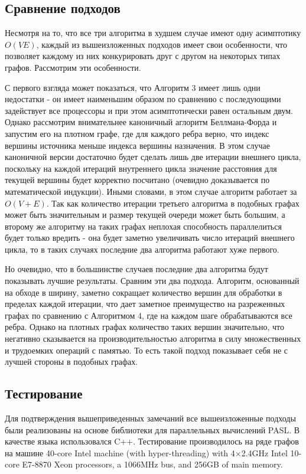 \FloatBarrier
\subsection{Сравнение подходов}
Несмотря на то, что все три алгоритма в худшем случае имеют одну асимптотику  $O(VE)$, каждый из вышеизложенных подходов имеет свои особенности, что позволяет каждому из них конкурировать друг с другом на некоторых типах графов. Рассмотрим эти особенности.

С первого взгляда может показаться, что Алгоритм 3 имеет лишь одни недостатки - он имеет наименьшим образом по сравнению с последующими задействует все процессоры и при этом асимптотически равен остальным двум. Однако рассмотрим внимательнее каноничный аглоритм Беллмана-Форда и запустим его на плотном графе, где для каждого ребра верно, что индекс вершины источника меньше индекса вершины назначения. В этом случае каноничной версии достаточно будет сделать лишь две итерации внешнего цикла, поскольку на каждой итераций внутреннего цикла значение расстояния для текущей вершины будет корректно посчитано (очевидно доказывается по математической индукции). Иными словами, в этом случае алгоритм работает за $O(V + E)$. Так как количество итерации третьего алгоритма в подобных графах может быть значительным и размер текущей очереди может быть большим, а второму же алгоритму на таких графах неплохая способность параллелиться будет только вредить - она будет заметно увеличивать число итераций внешнего цикла, то в таких случаях последние два алгоритма работают хуже первого.   

Но очевидно, что в большинстве случаев последние два алгоритма будут показывать лучшие результаты. Сравним эти два подхода. Алгоритм, основанный на обходе в ширину, заметно сокращает количество вершин для обработки в пределах каждой итерации, что дает заметное преимущество на разреженных графах по сравнению с Алгоритмом 4, где на каждом шаге обрабатываются все ребра. Однако на плотных графах количество таких вершин значительно, что негативно сказывается на производительностью алгоритма в силу множественных и трудоемких операций с памятью. То есть такой подход показывает себя не с лучшей стороны в подобных графах.  

\FloatBarrier
\subsection{Тестирование}

Для подтверждения вышеприведенных замечаний все вышеизложенные подходы были реализованы на основе библиотеки для параллельных вычислений PASL. В качестве языка использовался C++. Тестирование производилось на ряде графов на машине 40-core Intel machine (with hyper-threading) with 4×2.4GHz Intel
10-core E7-8870 Xeon processors, a 1066MHz bus, and 256GB of
main memory. 

